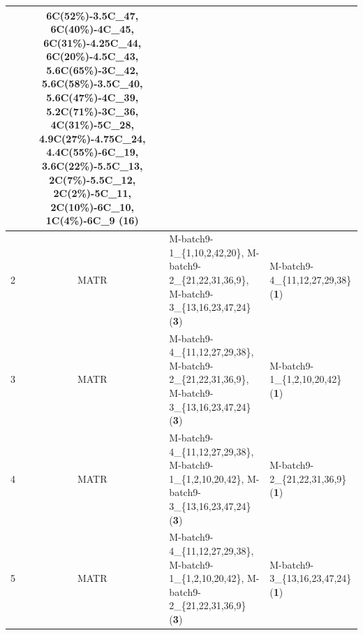 \documentclass[lettersize,journal]{IEEEtran}
\begin{document}
\begin{table}[htbp]
\begin{threeparttable}
\begin{tabularx}{\textwidth}{ccXX}
        & 6C(52\%)-3.5C\_47, 6C(40\%)-4C\_45,
        6C(31\%)-4.25C\_44, \newline
        6C(20\%)-4.5C\_43, 5.6C(65\%)-3C\_42, 5.6C(58\%)-3.5C\_40, \newline
        5.6C(47\%)-4C\_39, 5.2C(71\%)-3C\_36, 4C(31\%)-5C\_28, \newline
        4.9C(27\%)-4.75C\_24, 4.4C(55\%)-6C\_19, 3.6C(22\%)-5.5C\_13, \newline
        2C(7\%)-5.5C\_12, 2C(2\%)-5C\_11, 2C(10\%)-6C\_10, \newline
        1C(4\%)-6C\_9 (\textbf{16}) \\
        \midrule
        2     & MATR  & M-batch9-1\_\{1,10,2,42,20\}, M-batch9-2\_\{21,22,31,36,9\}, \newline M-batch9-3\_\{13,16,23,47,24\} (\textbf{3}) & M-batch9-4\_\{11,12,27,29,38\} (\textbf{1}) \\
        \midrule
        3     & MATR  & M-batch9-4\_\{11,12,27,29,38\}, M-batch9-2\_\{21,22,31,36,9\}, \newline M-batch9-3\_\{13,16,23,47,24\} (\textbf{3}) & M-batch9-1\_\{1,2,10,20,42\} (\textbf{1}) \\
        \midrule
        4     & MATR  & M-batch9-4\_\{11,12,27,29,38\}, M-batch9-1\_\{1,2,10,20,42\}, \newline M-batch9-3\_\{13,16,23,47,24\} (\textbf{3}) & M-batch9-2\_\{21,22,31,36,9\} (\textbf{1}) \\
        \midrule
        5     & MATR  & M-batch9-4\_\{11,12,27,29,38\}, M-batch9-1\_\{1,2,10,20,42\}, \newline M-batch9-2\_\{21,22,31,36,9\} (\textbf{3}) & M-batch9-3\_\{13,16,23,47,24\} (\textbf{1}) \\

\end{tabularx}
\end{threeparttable}
\end{table}
\end{document}
